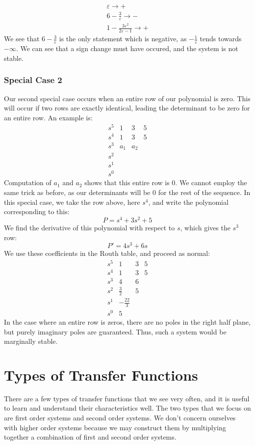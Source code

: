     \begin{gather}
        \varepsilon\rightarrow +\\
        6-\frac{3}{\varepsilon}\rightarrow -\\
        1-\frac{3\varepsilon^2}{2\varepsilon-1}\rightarrow+
    \end{gather}
We see that $6-\frac{3}{\varepsilon}$ is the only statement which is negative, as $-\frac{1}{\varepsilon}$ tends towards $-\infty$. We can see that a sign change must have occured, and the system is not stable.

\subsubsection{Special Case 2}
Our second special case occurs when an entire row of our polynomial is zero. This will occur if two rows are exactly identical, leading the determinant to be zero for an entire row. An example is:
$$
    \begin{array}{lccc}
         s^5&1&3&5  \\
         s^4&1&3&5\\
         s^3&a_1&a_2\\
         s^2&&\\
         s^1&\\
         s^0&
    \end{array}
    $$
    Computation of $a_1$ and $a_2$ shows that this entire row is $0$. We cannot employ the same trick as before, as our determinants will be $0$ for the rest of the sequence. In this special case, we take the row above, here $s^4$, and write the polynomial corresponding to this: $$P=s^4+3s^2+5$$
    We find the derivative of this polynomial with respect to $s$, which gives the $s^3$ row:
    $$P'=4s^3+6s$$
    We use these coefficients in the Routh table, and proceed as normal:
    $$
    \begin{array}{lccc}
         s^5&1&3&5  \\
         s^4&1&3&5\\
         s^3&4&6\\
         s^2&\frac{3}{2}&5\\
         s^1&-\frac{22}{3}\\
         s^0&5
    \end{array}
    $$
In the case where an entire row is zeros, there are no poles in the right half plane, but purely imaginary poles are guaranteed. Thus, such a system would be marginally stable.

\section{Types of Transfer Functions}
There are a few types of transfer functions that we see very often, and it is useful to learn and understand their characteristics well. The two types that we focus on are first order systems and second order systems. We don't concern ourselves with higher order systems because we may construct them by multiplying together a combination of first and second order systems.

